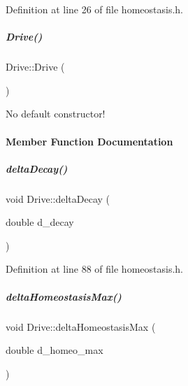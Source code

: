 Definition at line 26 of file homeostasis.\+h.

\mbox{\label{group__homeostasis_a289d5dd9c0008856918199c15c520b55}} 
\subparagraph{\texorpdfstring{Drive()}{Drive()}\hspace{0.1cm}{\footnotesize\ttfamily [2/2]}}
{\footnotesize\ttfamily Drive\+::\+Drive (\begin{DoxyParamCaption}{ }\end{DoxyParamCaption})\hspace{0.3cm}{\ttfamily [delete]}}



No default constructor! 



\paragraph{Member Function Documentation}
\mbox{\label{group__homeostasis_aca3acaf534b711dbfa953503b2880b5d}} 
\subparagraph{\texorpdfstring{delta\+Decay()}{deltaDecay()}}
{\footnotesize\ttfamily void Drive\+::delta\+Decay (\begin{DoxyParamCaption}\item[{double}]{d\+\_\+decay }\end{DoxyParamCaption})\hspace{0.3cm}{\ttfamily [inline]}}



Definition at line 88 of file homeostasis.\+h.

\mbox{\label{group__homeostasis_a56fcf4300b64315033b5b2224235d3e3}} 
\subparagraph{\texorpdfstring{delta\+Homeostasis\+Max()}{deltaHomeostasisMax()}}
{\footnotesize\ttfamily void Drive\+::delta\+Homeostasis\+Max (\begin{DoxyParamCaption}\item[{double}]{d\+\_\+homeo\+\_\+max }\end{DoxyParamCaption})\hspace{0.3cm}{\ttfamily [inline]}}




